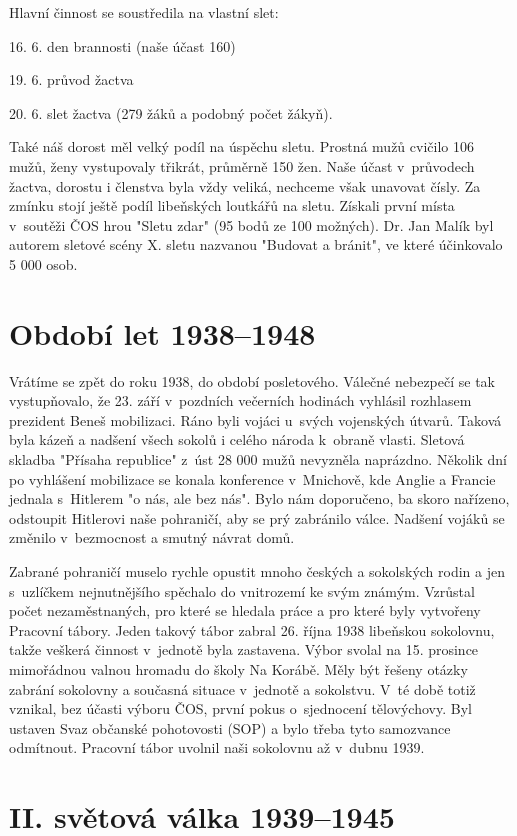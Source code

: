 \documentclass[a5paper, 12pt, twoside]{article}
\begin{document}
Hlavní činnost se soustředila na vlastní slet:

16. 6. den brannosti (naše účast 160)

19. 6. průvod žactva

20. 6. slet žactva (279 žáků a podobný počet žákyň).

Také náš dorost měl velký podíl na úspěchu sletu. Prostná mužů cvičilo
106 mužů, ženy vystupovaly třikrát, průměrně 150 žen. Naše účast
v~průvodech žactva, dorostu i členstva byla vždy veliká, nechceme však
unavovat čísly. Za zmínku stojí ještě podíl libeňských loutkářů na
sletu. Získali první místa v~soutěži ČOS hrou "Sletu zdar" (95 bodů ze
100 možných). Dr. Jan Malík byl autorem sletové scény X. sletu nazvanou
"Budovat a bránit", ve které účinkovalo 5 000 osob.

\section{Období let 1938--1948}

Vrátíme se zpět do roku 1938, do období posletového. Válečné nebezpečí
se tak vystupňovalo, že 23. září v~pozdních večerních hodinách vyhlásil
rozhlasem prezident Beneš mobilizaci. Ráno byli vojáci u~svých
vojenských útvarů. Taková byla kázeň a nadšení všech sokolů i celého
národa k~obraně vlasti. Sletová skladba "Přísaha republice" z~úst 28
000 mužů nevyzněla naprázdno. Několik dní po vyhlášení mobilizace se
konala konference v~Mnichově, kde Anglie a Francie jednala s~Hitlerem "o
nás, ale bez nás". Bylo nám doporučeno, ba skoro nařízeno, odstoupit
Hitlerovi naše pohraničí, aby se prý zabránilo válce. Nadšení vojáků se
změnilo v~bezmocnost a smutný návrat domů.

Zabrané pohraničí muselo rychle opustit mnoho českých a sokolských rodin
a jen s~uzlíčkem nejnutnějšího spěchalo do vnitrozemí ke svým známým.
Vzrůstal počet nezaměstnaných, pro které se hledala práce a pro které
byly vytvořeny Pracovní tábory. Jeden takový tábor zabral 26. října 1938
libeňskou sokolovnu, takže veškerá činnost v~jednotě byla zastavena.
Výbor svolal na 15. prosince mimořádnou valnou hromadu do školy Na
Korábě. Měly být řešeny otázky zabrání sokolovny a současná situace
v~jednotě a sokolstvu. V~té době totiž vznikal, bez účasti výboru ČOS,
první pokus o~sjednocení tělovýchovy. Byl ustaven Svaz občanské
pohotovosti (SOP) a bylo třeba tyto samozvance odmítnout. Pracovní tábor
uvolnil naši sokolovnu až v~dubnu 1939.

\section{II. světová válka
1939--1945}
\end{document}
